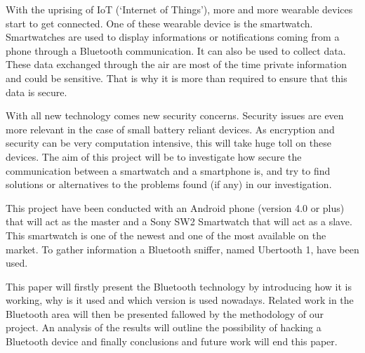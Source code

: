 With the uprising of IoT (‘Internet of Things’), more and more wearable devices start to get connected. One of these wearable device is the smartwatch. Smartwatches are used to display informations or notifications coming from a phone through a Bluetooth communication. It can also be used to collect data. These data exchanged through the air are most of the time private information and could be sensitive. That is why it is more than required to ensure that this data is secure.

With all new technology comes new security concerns. Security issues are even more relevant in the case of small battery reliant devices. As encryption and security can be very computation intensive, this will take huge toll on these devices. The aim of this project will be to investigate how secure the communication between a smartwatch and a smartphone is, and try to find solutions or alternatives to the problems found (if any) in our investigation.

This project have been conducted with an Android phone (version 4.0 or plus) that will act as the master and a Sony SW2 Smartwatch that will act as a slave. This smartwatch is one of the newest and one of the most available on the market. To gather information a Bluetooth sniffer, named Ubertooth 1, have been used.

This paper will firstly present the Bluetooth technology by introducing how it is working, why is it used and which version is used nowadays. Related work in the Bluetooth area will then be presented fallowed by the methodology of our project. An analysis of the results will outline the possibility of hacking a Bluetooth device and finally conclusions and future work will end this paper.